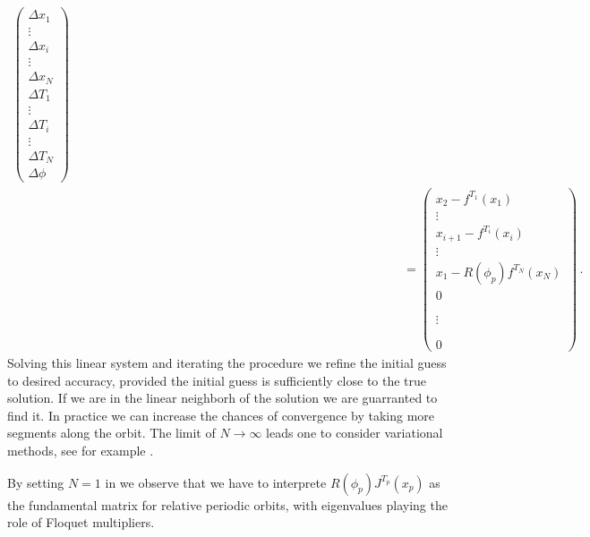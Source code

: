 \begin{eqnarray*}
{     \left(\begin{array}{c}
        \Delta x_1 \\
	\vdots\\
	\Delta x_i \\
	\vdots\\
	\Delta x_N \\
        \Delta T_1 \\
	\vdots	\\
	\Delta T_i \\
	\vdots	\\
	\Delta T_N \\	
	\Delta \phi
     \end{array}\right)}\\%
     & & 
     \hspace{300pt}=\left(\begin{array}{c}
	x_2-f^{T_1}(x_1)\\
	\vdots\\	
        x_{i+1}-f^{T_i}(x_i) \\
	\vdots\\
	x_{1}-R(\phi_p)f^{T_N}(x_N)\\
       	0    \\
	\\
	\\
	\vdots\\
	\\
	\\
	0
     \end{array}\right)\,.
     \label{eq:NewtonScheme}
\end{eqnarray*}
\normalsize
Solving this linear system and iterating the procedure we refine the initial guess to desired accuracy,
provided the initial guess is sufficiently close to the true solution. If we are in the linear neighborh
of the solution we are guarranted to find it. In practice we can increase the chances of convergence 
by taking more segments along the orbit. The limit of $N\rightarrow\infty$ leads one to consider
variational methods, see for example .

By setting $N=1$ in  we observe that we have to interprete $R(\phi_p)J^{T_p}(x_p)$
as the fundamental matrix for relative periodic orbits, with eigenvalues playing the role
of Floquet multipliers.


